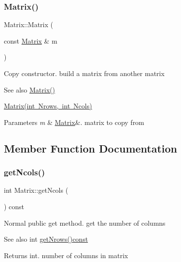 \subsubsection{\texorpdfstring{Matrix()}{Matrix()}\hspace{0.1cm}{\footnotesize\ttfamily [3/3]}}
{\footnotesize\ttfamily Matrix\+::\+Matrix (\begin{DoxyParamCaption}\item[{const \mbox{\hyperlink{classMatrix}{Matrix}} \&}]{m }\end{DoxyParamCaption})}

Copy constructor. build a matrix from another matrix \begin{DoxySeeAlso}{See also}
\mbox{\hyperlink{classMatrix_a2dba13c45127354c9f75ef576f49269b}{Matrix()}} 

\mbox{\hyperlink{classMatrix_a135a15de1126d735bb95fcc839d739d7}{Matrix(int Nrows, int Ncols)}} 
\end{DoxySeeAlso}

\begin{DoxyParams}{Parameters}
{\em m} & \mbox{\hyperlink{classMatrix}{Matrix}}\&. matrix to copy from \\
\hline
\end{DoxyParams}


\subsection{Member Function Documentation}
\mbox{\label{classMatrix_ae0a5f2154953b8d129a90b04f91d9079}} 
\subsubsection{\texorpdfstring{get\+Ncols()}{getNcols()}}
{\footnotesize\ttfamily int Matrix\+::get\+Ncols (\begin{DoxyParamCaption}{ }\end{DoxyParamCaption}) const}

Normal public get method. get the number of columns \begin{DoxySeeAlso}{See also}
int \mbox{\hyperlink{classMatrix_a711f84a1c62832d9d197d78c9855a276}{get\+Nrows()const}} 
\end{DoxySeeAlso}
\begin{DoxyReturn}{Returns}
int. number of columns in matrix 
\end{DoxyReturn}
\mbox{\label{classMatrix_a711f84a1c62832d9d197d78c9855a276}} 
